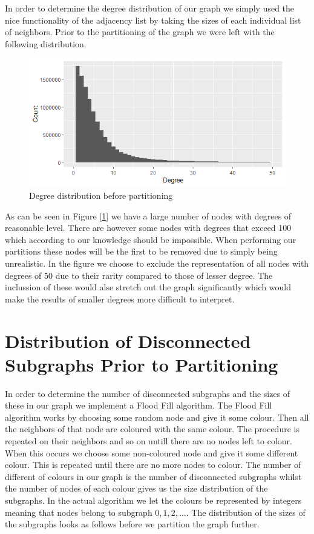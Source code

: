 \documentclass[a4paper,10pt]{article}
\newcommand\bref[1]{[\ref{#1}]}
\begin{document}
In order to determine the degree distribution of our graph we simply used the nice functionality of the adjacency list by taking the sizes of each individual list of neighbors. Prior to the partitioning of the graph we were left with the following distribution.
\begin{figure}[H]
	\centering
	\includegraphics[width=0.85\linewidth]{degreesprior.png}
	\caption{Degree distribution before partitioning}
	\label{fig:degprior}
\end{figure}
As can be seen in Figure \bref{fig:degprior} we have a large number of nodes with degrees of reasonable level. 
There are however some nodes with degrees that exceed 100 which according to our knowledge should be impossible. 
When performing our partitions these nodes will be the first to be removed due to simply being unrealistic. 
In the figure we choose to exclude the representation of all nodes with degrees of 50 due to their rarity compared to those of lesser degree. 
The inclussion of these would alse stretch out the graph significantly which would make the results of smaller degrees more difficult to interpret. 

\section{Distribution of Disconnected Subgraphs Prior to Partitioning}

In order to determine the number of disconnected subgraphs and the sizes of these in our graph we implement a Flood Fill algorithm. 
The Flood Fill algorithm works by choosing some random node and give it some colour. 
Then all the neighbors of that node are coloured with the same colour. 
The procedure is repeated on their neighbors and so on untill there are no nodes left to colour. 
When this occurs we choose some non-coloured node and give it some different colour. This is repeated until there are no more nodes to colour. 
The number of different of colours in our graph is the number of disconnected subgraphs whilst the number of nodes of each colour gives us the size distribution of the subgraphs. 
In the actual algorithm we let the colours be represented by integers meaning that nodes belong to subgraph $0,1,2,...$. The distribution of the sizes of the subgraphs looks as follows before we partition the graph further.
\end{document}
